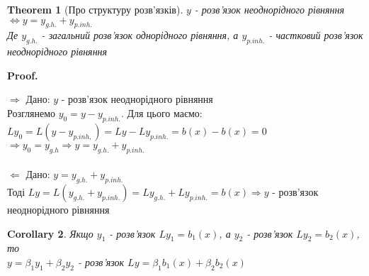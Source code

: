\documentclass[a4paper, 10pt]{article}
\makeatletter
\def\qed{$\blacksquare$}
\def\rightproof{$\boxed{\Rightarrow}$ }
\def\leftproof{$\boxed{\Leftarrow}$ }
\theoremstyle{theoremdd}
\newtheorem{theorem}{Theorem}[subsection]
\theoremstyle{theoremdd}
\theoremstyle{theoremdd}
\theoremstyle{theoremdd}
\theoremstyle{theoremdd}
\theoremstyle{theoremdd}
\theoremstyle{theoremdd}
\theoremstyle{theoremdd}
\newtheorem{corollary}[theorem]{Corollary}
\renewenvironment{proof}[1][Proof.\\]{\par
\pushQED{\hfill \qed}%
\normalfont \topsep6\p@\@plus6\p@\relax
\trivlist
\item\relax
{\bfseries
#1\@addpunct{.}}\hspace\labelsep\ignorespaces
}{%
\popQED\endtrivlist\@endpefalse
}
\makeatother
\begin{document}
\begin{theorem}[Про структуру розв'язків]
$y$ - розв'язок неоднорідного рівняння $\iff y = y_{g.h.} + y_{p.inh.}$\\
Де $y_{g.h.}$ - загальний розв'язок однорідного рівняння, а $y_{p.inh.}$ - частковий розв'язок неоднорідного рівняння
\end{theorem}

\begin{proof}
\rightproof Дано: $y$ - розв'язок неоднорідного рівняння\\
Розглянемо $y_0 = y - y_{p.inh.}$. Для цього маємо:\\
$Ly_0 = L(y - y_{p.inh,}) = Ly - Ly_{p.inh.} = b(x) - b(x) = 0$\\
$\Rightarrow y_0 = y_{g.h} \Rightarrow y = y_{g.h.} + y_{p.inh.}$\\
\\
\leftproof Дано: $y = y_{g.h.} + y_{p.inh.}$\\
Тоді $Ly = L(y_{g.h.} + y_{p.inh.}) = Ly_{g.h.} + Ly_{p.inh.} = b(x) \Rightarrow y$ - розв'язок неоднорідного рівняння 
\end{proof}

\begin{corollary}
Якщо $y_1$ - розв'язок $Ly_1 = b_1(x)$, а $y_2$ - розв'язок $Ly_2 = b_2(x)$, то\\
$y = \beta_1 y_1 + \beta_2 y_2$ - розв'язок $Ly = \beta_1 b_1(x) + \beta_2 b_2(x)$
\end{corollary}
\end{document}

